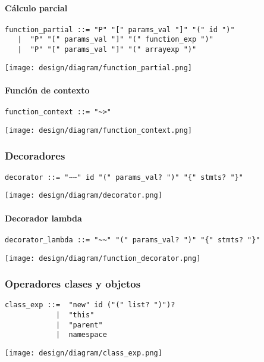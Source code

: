 \paragraph {Cálculo parcial}
\begin{lstlisting}[style=nonumbers]
function_partial ::= "P" "[" params_val "]" "(" id ")"
   |  "P" "[" params_val "]" "(" function_exp ")"
   |  "P" "[" params_val "]" "(" arrayexp ")"
\end{lstlisting}
\begin{center}
\texttt{[image: design/diagram/function\_partial.png]} 
\end{center}
\paragraph {Función de contexto}
\begin{lstlisting}[style=nonumbers]
function_context ::= "~>"
\end{lstlisting}
\begin{center}
\texttt{[image: design/diagram/function\_context.png]} 
\end{center}


\subsubsection{Decoradores}
\begin{lstlisting}[style=nonumbers]
decorator ::= "~~" id "(" params_val? ")" "{" stmts? "}"
\end{lstlisting}
\begin{center}
\texttt{[image: design/diagram/decorator.png]} 
\end{center}
\paragraph{Decorador lambda}
\begin{lstlisting}[style=nonumbers]
decorator_lambda ::= "~~" "(" params_val? ")" "{" stmts? "}"
\end{lstlisting}
\begin{center}
\texttt{[image: design/diagram/function\_decorator.png]} 
\end{center}

\subsubsection{Operadores clases y objetos}
\begin{multicols}{2}
\begin{lstlisting}[style=nonumbers]      
class_exp ::=  "new" id ("(" list? ")")?
            |  "this" 
            |  "parent"
            |  namespace
\end{lstlisting}  
\columnbreak	
\begin{center}
\texttt{[image: design/diagram/class\_exp.png]} 
\end{center}
\end{multicols}

